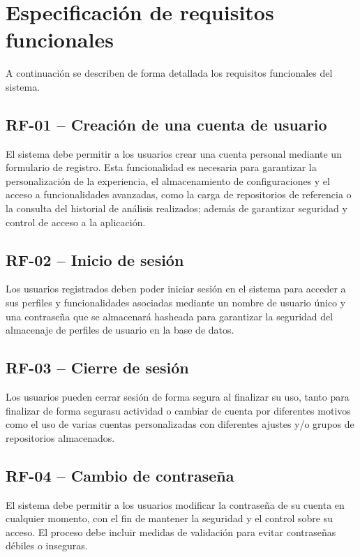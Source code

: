 \section{Especificación de requisitos funcionales}

A continuación se describen de forma detallada los requisitos funcionales del sistema.

\subsection*{RF-01 – Creación de una cuenta de usuario}
El sistema debe permitir a los usuarios crear una cuenta personal mediante un formulario de registro. Esta funcionalidad es necesaria para garantizar la personalización de la experiencia, el almacenamiento de configuraciones y el acceso a funcionalidades avanzadas, como la carga de repositorios de referencia o la consulta del historial de análisis realizados; además de garantizar seguridad y control de acceso a la aplicación.

\subsection*{RF-02 – Inicio  de sesión}
Los usuarios registrados deben poder iniciar sesión en el sistema para acceder a sus perfiles y funcionalidades asociadas mediante un nombre de usuario único y una contraseña que se almacenará hasheada para garantizar la seguridad del almacenaje de perfiles de usuario en la base de datos.

\subsection*{RF-03 – Cierre de sesión}
Los usuarios pueden cerrar sesión de forma segura al finalizar su uso, tanto para finalizar de forma segurasu actividad o cambiar de cuenta por diferentes motivos como el uso de varias cuentas personalizadas con diferentes ajustes y/o grupos de repositorios almacenados.

\subsection*{RF-04 – Cambio de contraseña}
El sistema debe permitir a los usuarios modificar la contraseña de su cuenta en cualquier momento, con el fin de mantener la seguridad y el control sobre su acceso. El proceso debe incluir medidas de validación para evitar contraseñas débiles o inseguras.

